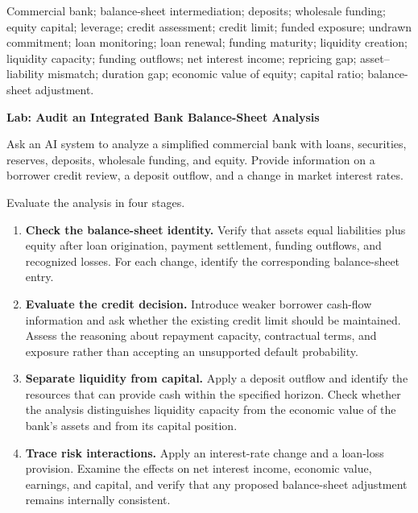 

Commercial bank; balance-sheet intermediation; deposits; wholesale funding;
equity capital; leverage; credit assessment; credit limit; funded exposure;
undrawn commitment; loan monitoring; loan renewal; funding maturity;
liquidity creation; liquidity capacity; funding outflows; net interest income;
repricing gap; asset--liability mismatch; duration gap; economic value of equity;
capital ratio; balance-sheet adjustment.



\textbf{Lab: Audit an Integrated Bank Balance-Sheet Analysis}

Ask an AI system to analyze a simplified commercial bank with loans, securities,
reserves, deposits, wholesale funding, and equity. Provide information on a
borrower credit review, a deposit outflow, and a change in market interest rates.

Evaluate the analysis in four stages.

\begin{enumerate}

\item \textbf{Check the balance-sheet identity.}
Verify that assets equal liabilities plus equity after loan origination,
payment settlement, funding outflows, and recognized losses. For each change,
identify the corresponding balance-sheet entry.

\item \textbf{Evaluate the credit decision.}
Introduce weaker borrower cash-flow information and ask whether the existing
credit limit should be maintained. Assess the reasoning about repayment
capacity, contractual terms, and exposure rather than accepting an unsupported
default probability.

\item \textbf{Separate liquidity from capital.}
Apply a deposit outflow and identify the resources that can provide cash within
the specified horizon. Check whether the analysis distinguishes liquidity
capacity from the economic value of the bank's assets and from its capital
position.

\item \textbf{Trace risk interactions.}
Apply an interest-rate change and a loan-loss provision. Examine the effects on
net interest income, economic value, earnings, and capital, and verify that any
proposed balance-sheet adjustment remains internally consistent.

\end{enumerate}


